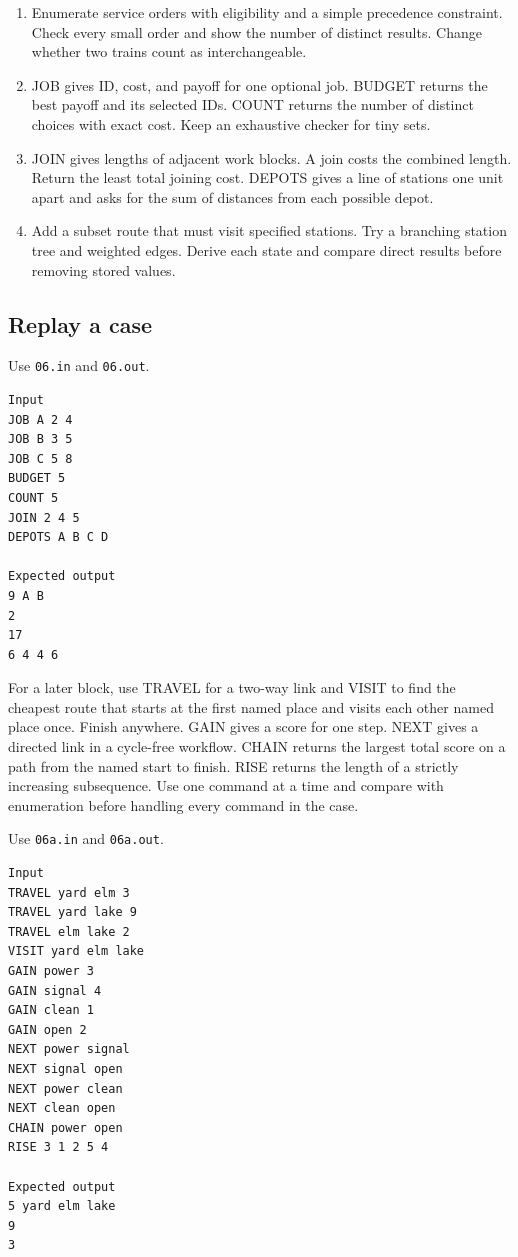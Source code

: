 \documentclass[11pt,letterpaper]{article}
\begin{document}
\begin{enumerate}
\item Enumerate service orders with eligibility and a simple precedence constraint. Check every small order and show the number of distinct results. Change whether two trains count as interchangeable.
\item JOB gives ID, cost, and payoff for one optional job. BUDGET returns the best payoff and its selected IDs. COUNT returns the number of distinct choices with exact cost. Keep an exhaustive checker for tiny sets.
\item JOIN gives lengths of adjacent work blocks. A join costs the combined length. Return the least total joining cost. DEPOTS gives a line of stations one unit apart and asks for the sum of distances from each possible depot.
\item Add a subset route that must visit specified stations. Try a branching station tree and weighted edges. Derive each state and compare direct results before removing stored values.
\end{enumerate}

\subsection*{Replay a case}

Use \texttt{06.in} and \texttt{06.out}.

\begin{samepage}
\small
\begin{verbatim}
Input
JOB A 2 4
JOB B 3 5
JOB C 5 8
BUDGET 5
COUNT 5
JOIN 2 4 5
DEPOTS A B C D

Expected output
9 A B
2
17
6 4 4 6
\end{verbatim}
\end{samepage}

For a later block, use TRAVEL for a two-way link and VISIT to find the cheapest route that starts at the first named place and visits each other named place once. Finish anywhere. GAIN gives a score for one step. NEXT gives a directed link in a cycle-free workflow. CHAIN returns the largest total score on a path from the named start to finish. RISE returns the length of a strictly increasing subsequence. Use one command at a time and compare with enumeration before handling every command in the case.

Use \texttt{06a.in} and \texttt{06a.out}.

\begin{samepage}
\small
\begin{verbatim}
Input
TRAVEL yard elm 3
TRAVEL yard lake 9
TRAVEL elm lake 2
VISIT yard elm lake
GAIN power 3
GAIN signal 4
GAIN clean 1
GAIN open 2
NEXT power signal
NEXT signal open
NEXT power clean
NEXT clean open
CHAIN power open
RISE 3 1 2 5 4

Expected output
5 yard elm lake
9
3
\end{verbatim}
\end{samepage}
\end{document}
